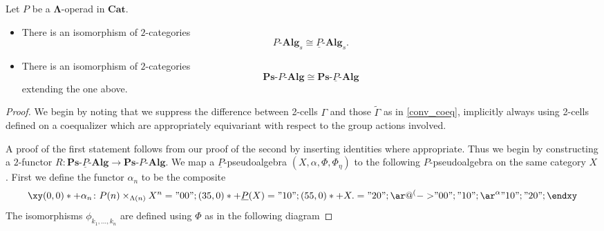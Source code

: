 \documentclass{amsbook} %
\newcommand{\mb}{\mathbf}
\newcommand{\ML}{\mathbf{\Lambda}}
\numberwithin{section}{chapter}
\begin{document}
\begin{thm}
Let $P$ be a $\ML$-operad in $\mb{Cat}$.
\begin{itemize}
\item There is an isomorphism of $2$-categories
    \[
        P\mbox{-}\mb{Alg}_{s} \cong \underline{P}\mbox{-}\mb{Alg}_{s}.
    \]
\item There is an isomorphism of $2$-categories
    \[
        \mb{Ps}\mbox{-}P\mbox{-}\mb{Alg} \cong \mb{Ps}\mbox{-}\underline{P}\mbox{-}\mb{Alg}
    \]
    extending the one above.
\end{itemize}
\end{thm}
\begin{proof}
We begin by noting that we suppress the difference between 2-cells $\Gamma$ and those $\tilde{\Gamma}$ as in \ref{conv_coeq}, implicitly always using 2-cells defined on a coequalizer which are appropriately equivariant with respect to the group actions involved.

A proof of the first statement follows from our proof of the second by inserting identities where appropriate.  Thus we begin by constructing a $2$-functor $R \colon \mb{Ps}\mbox{-}\underline{P}\mbox{-}\mb{Alg} \rightarrow \mb{Ps}\mbox{-}P\mbox{-}\mb{Alg}$. We map a $\underline{P}$-pseudoalgebra $(X,\alpha,\Phi,\Phi_\eta)$ to the following $P$-pseudoalgebra on the same category $X$. First we define the functor $\alpha_n$ to be the composite
    \[
        \xy
            (0,0)*+{\alpha_n \colon P(n) \times_{\Lambda(n)} X^n}="00";
            (35,0)*+{\underline{P}(X)}="10";
            (55,0)*+{X.}="20";
            {\ar@{^{(}->} "00" ; "10"};
            {\ar^{\alpha} "10" ; "20"};
        \endxy
    \]
The isomorphisms $\phi_{k_1,\ldots,k_n}$ are defined using $\Phi$ as in the following diagram


\end{proof}
\end{document}
